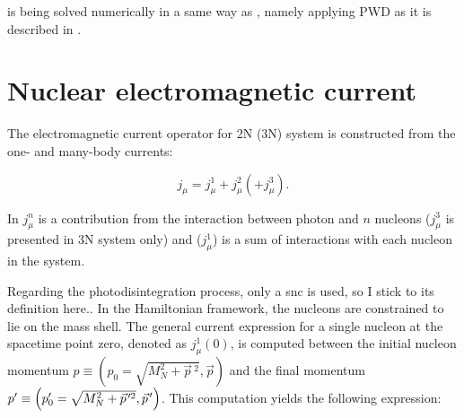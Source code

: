      is being solved numerically in a same way as , namely applying
    PWD as it is described in \cite{GLOCKLE_report_1996}.


    \section{Nuclear electromagnetic current}
    \label{sec_current}
    

    The electromagnetic current operator for 2N (3N) system is constructed 
    from the one- and many-body currents:
    
    \begin{equation}
        j_\mu = j_\mu^1 + j_\mu^2 (+ j_\mu^3).
        \label{j_mu_gen}
    \end{equation}

    In  $j_\mu^n$ is a contribution from the interaction between photon and 
    $n$ nucleons ($j_\mu^3$ is presented in 3N system only)
    and ($j_\mu^1$) is a sum of interactions with each nucleon in the system. 



    Regarding the photodisintegration process, only a \gls{snc} is used, so I stick to its definition here.. 
    In the Hamiltonian framework, the nucleons are constrained to lie on the mass shell.
    The general current expression for a
    single nucleon at the spacetime point zero, denoted as $j^1_\mu(0)$, is computed between the initial nucleon momentum
    $p \equiv\left(p_0=\sqrt{M_N^2+\vec{p}\,^2}, \vec{p}\right)$
    and the final momentum
    $p^{\prime} \equiv\left(p_0^{\prime}=\sqrt{M_N^2+\pvec{p}^{2}}, \pvec{p}\right)$. This computation yields the following expression:

